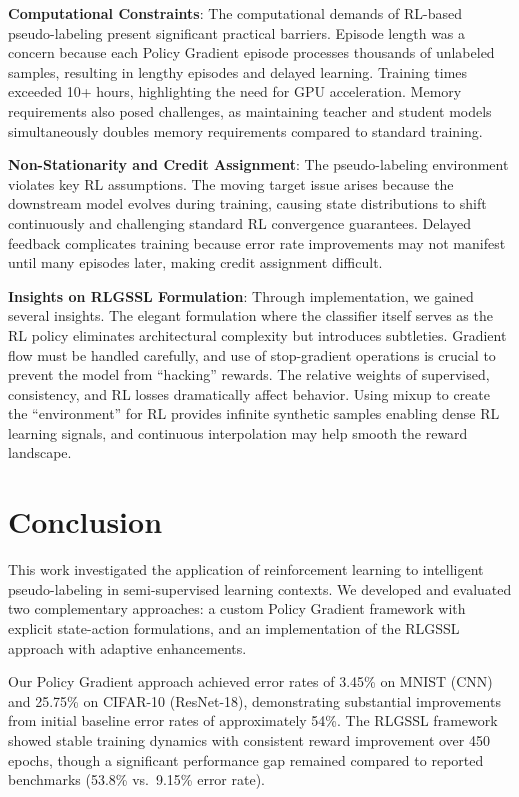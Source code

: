 \documentclass[pdflatex,sn-mathphys-num]{sn-jnl}%
\theoremstyle{thmstyleone}%
\theoremstyle{thmstyletwo}%
\theoremstyle{thmstylethree}%
\begin{document}
\textbf{Computational Constraints}: The computational demands of RL-based pseudo-labeling present significant practical barriers. Episode length was a concern because each Policy Gradient episode processes thousands of unlabeled samples, resulting in lengthy episodes and delayed learning. Training times exceeded 10+ hours, highlighting the need for GPU acceleration. Memory requirements also posed challenges, as maintaining teacher and student models simultaneously doubles memory requirements compared to standard training.

\textbf{Non-Stationarity and Credit Assignment}: The pseudo-labeling environment violates key RL assumptions. The moving target issue arises because the downstream model evolves during training, causing state distributions to shift continuously and challenging standard RL convergence guarantees. Delayed feedback complicates training because error rate improvements may not manifest until many episodes later, making credit assignment difficult.

\textbf{Insights on RLGSSL Formulation}: Through implementation, we gained several insights. The elegant formulation where the classifier itself serves as the RL policy eliminates architectural complexity but introduces subtleties. Gradient flow must be handled carefully, and use of stop-gradient operations is crucial to prevent the model from ``hacking'' rewards. The relative weights of supervised, consistency, and RL losses dramatically affect behavior. Using mixup to create the ``environment'' for RL provides infinite synthetic samples enabling dense RL learning signals, and continuous interpolation may help smooth the reward landscape.

\section{Conclusion}\label{sec:conclusion}

This work investigated the application of reinforcement learning to intelligent pseudo-labeling in semi-supervised learning contexts. We developed and evaluated two complementary approaches: a custom Policy Gradient framework with explicit state-action formulations, and an implementation of the RLGSSL approach with adaptive enhancements.

Our Policy Gradient approach achieved error rates of 3.45\% on MNIST (CNN) and 25.75\% on CIFAR-10 (ResNet-18), demonstrating substantial improvements from initial baseline error rates of approximately 54\%. The RLGSSL framework showed stable training dynamics with consistent reward improvement over 450 epochs, though a significant performance gap remained compared to reported benchmarks (53.8\% vs.\ 9.15\% error rate).
\end{document}
